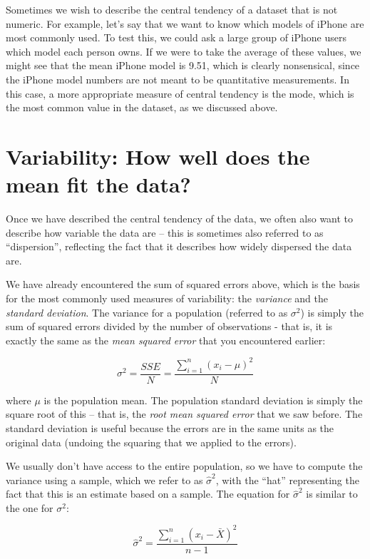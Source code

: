 \documentclass[12pt,]{book}
\theoremstyle{definition}
\theoremstyle{definition}
\theoremstyle{definition}
\theoremstyle{remark}
\begin{document}
Sometimes we wish to describe the central tendency of a dataset that is not numeric. For example, let's say that we want to know which models of iPhone are most commonly used. To test this, we could ask a large group of iPhone users which model each person owns. If we were to take the average of these values, we might see that the mean iPhone model is 9.51, which is clearly nonsensical, since the iPhone model numbers are not meant to be quantitative measurements. In this case, a more appropriate measure of central tendency is the mode, which is the most common value in the dataset, as we discussed above.

\hypertarget{variability-how-well-does-the-mean-fit-the-data}{%
\section{Variability: How well does the mean fit the data?}\label{variability-how-well-does-the-mean-fit-the-data}}

Once we have described the central tendency of the data, we often also want to describe how variable the data are -- this is sometimes also referred to as ``dispersion'', reflecting the fact that it describes how widely dispersed the data are.

We have already encountered the sum of squared errors above, which is the basis for the most commonly used measures of variability: the \emph{variance} and the \emph{standard deviation}. The variance for a population (referred to as \(\sigma^2\)) is simply the sum of squared errors divided by the number of observations - that is, it is exactly the same as the \emph{mean squared error} that you encountered earlier:

\[
\sigma^2 = \frac{SSE}{N} = \frac{\sum_{i=1}^n (x_i - \mu)^2}{N}
\]

where \(\mu\) is the population mean. The population standard deviation is simply the square root of this -- that is, the \emph{root mean squared error} that we saw before. The standard deviation is useful because the errors are in the same units as the original data (undoing the squaring that we applied to the errors).

We usually don't have access to the entire population, so we have to compute the variance using a sample, which we refer to as \(\hat{\sigma}^2\), with the ``hat'' representing the fact that this is an estimate based on a sample. The equation for \(\hat{\sigma}^2\) is similar to the one for \(\sigma^2\):

\[
\hat{\sigma}^2 = \frac{\sum_{i=1}^n (x_i - \bar{X})^2}{n-1}
\]
\end{document}
